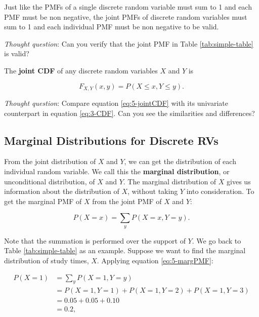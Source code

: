 \documentclass[
]{book}
\begin{document}
Just like the PMFs of a single discrete random variable must sum to 1 and each PMF must be non negative, the joint PMFs of discrete random variables must sum to 1 and each individual PMF must be non negative to be valid.

\emph{Thought question}: Can you verify that the joint PMF in Table \ref{tab:simple-table} is valid?

The \textbf{joint CDF} of any discrete random variables \(X\) and \(Y\) is

\begin{equation} 
F_{X,Y}(x,y) = P(X \leq x, Y \leq y).
\label{eq:5-jointCDF}
\end{equation}

\emph{Thought question}: Compare equation \eqref{eq:5-jointCDF} with its univariate counterpart in equation \eqref{eq:3-CDF}. Can you see the similarities and differences?

\hypertarget{marginal-distributions-for-discrete-rvs}{%
\subsection{Marginal Distributions for Discrete RVs}\label{marginal-distributions-for-discrete-rvs}}

From the joint distribution of \(X\) and \(Y\), we can get the distribution of each individual random variable. We call this the \textbf{marginal distribution}, or unconditional distribution, of \(X\) and \(Y\). The marginal distribution of \(X\) gives us information about the distribution of \(X\), without taking \(Y\) into consideration. To get the marginal PMF of \(X\) from the joint PMF of \(X\) and \(Y\):

\begin{equation} 
P(X=x) = \sum_y P(X=x, Y=y).
\label{eq:5-margPMF}
\end{equation}

Note that the summation is performed over the support of \(Y\). We go back to Table \ref{tab:simple-table} as an example. Suppose we want to find the marginal distribution of study times, \(X\). Applying equation \eqref{eq:5-margPMF}:

\[
\begin{split}
P(X=1) &= \sum_y P(X=1, Y=y)\\
 &= P(X=1, Y=1) + P(X=1, Y=2) + P(X=1, Y=3) \\
&= 0.05 + 0.05 + 0.10\\
&= 0.2,
\end{split}
\]
\end{document}
